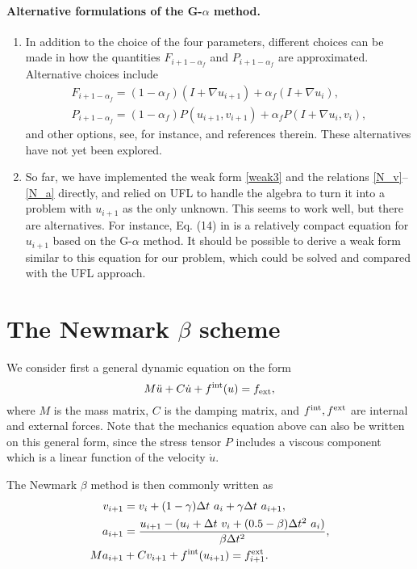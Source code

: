 \documentclass[a4paper,10pt]{article}
\begin{document}
\paragraph{Alternative formulations of the G-$\alpha$ method.}
\begin{enumerate}
  \item In addition to the choice of the four parameters, different choices
  can be made in how the quantities $F_{i+1-\alpha_f}$ and $P_{i+1-\alpha_f}$
  are approximated. Alternative choices include
  \begin{align*}
   F_{i+1-\alpha_f} = (1-\alpha_f) (I + \nabla u_{i+1}) + \alpha_f(I + \nabla u_{i}), \\
   P_{i+1-\alpha_f} = (1-\alpha_f) P(u_{i+1}, v_{i+1}) + \alpha_f P (I + \nabla u_{i}, v_{i}) ,
 \end{align*}
 and other options, see, for instance, \cite{erlicher2002analysis} and references therein.
 These alternatives have not yet been explored.

 \item So far, we have implemented the weak form \eqref{weak3} and the relations
 \eqref{N_v}--\eqref{N_a} directly, and relied on UFL to handle the algebra to turn it
 into a problem with $u_{i+1}$ as the only unknown. This seems to work well, but
 there are alternatives. For instance, Eq. (14) in \cite{erlicher2002analysis} is
 a relatively compact equation for $u_{i+1}$ based on the G-$\alpha$ method. It should
 be possible to derive a weak form similar to this equation for our problem, which could be
 solved and compared with the UFL approach.
\end{enumerate}


\appendix
\section{The Newmark $\beta$ scheme}
We consider first a general dynamic equation on the form
\[
M\ddot{u} + C\dot{u} + f^{\rm int}(u) = f_{\rm ext},
\]
where $M$ is the mass matrix, $C$ is the damping matrix, and $f^{\rm int}, f^{\rm ext}$
are internal and external forces. Note that the mechanics equation above can also
be written on this general form, since the stress tensor $P$ includes a viscous
component which is a linear function of the velocity $\dot{u}$.

The Newmark $\beta$ method is then commonly written as
\begin{align}
v_{i+1} &= v_i + (1-\gamma) \Delta t ~ a_i + \gamma \Delta t ~ a_{i+1}, \\
a_{i+1} &= \frac{u_{i+1} - (u_i + \Delta t ~ v_i + (0.5 - \beta) \Delta t^2 ~ a_i)}{\beta \Delta t^2}, \\
Ma_{i+1} &+ C v_{i+1} + f^{\rm int}(u_{i+1}) = f^{\rm ext}_{i+1} .
\end{align}
\end{document}
